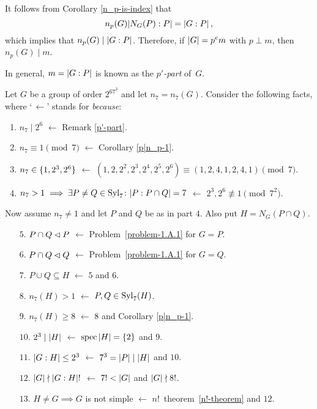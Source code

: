 \begin{rem}\label{p'-part}
    It follows from {\rm Corollary \ref{n_p-is-index}} that
    $$
        n_p(G)|N_G(P):P|=\left\vert{G:P}\right\vert,
    $$
    which implies that $n_p(G)\mid\left\vert{G:P}\right\vert$. Therefore, if\/ $\left\vert{G}\right\vert=p^em$ with $p\perp m$, then $n_p(G)\mid m$.

    In general, $m=\left\vert{G:P}\right\vert$ is known as the \textsl{$p'$-part} of\/~$G$.
\end{rem}


\begin{xmpl}
    Let $G$ be a group of order $2^67^3$ and let $n_7=n_7(G)$. Consider the following facts, where `$\,\leftarrow$' stands for \emph{because}:
    \begin{enumerate}[$1$.]
        \item $n_7\mid2^6$ $\leftarrow$ {\rm Remark \ref{p'-part}}.
        \item $n_7\equiv1\pmod7$ $\leftarrow$ {\rm Corollary \ref{p|n_p-1}}.
        \item $n_7\in\{1, 2^3, 2^6\}$ $\leftarrow$ $(1, 2, 2^2, 2^3, 2^4, 2^5, 2^6)\equiv(1, 2, 4, 1, 2, 4, 1)\pmod7$.
        \item $n_7>1\implies\exists P\ne Q\in{\rm Syl}_7\colon |P:P\cap Q|=7$ $\leftarrow$ $2^3,2^6\not\equiv1\pmod{7^2}$.
    \end{enumerate}
        Now assume\/ $n_7\ne1$ and let\/ $P$ and\/ $Q$ be as in part $4$. Also put $H=N_G(P\cap Q)$.
    \begin{enumerate}
        \item[$5$.] $P\cap Q\lhd P$ $\leftarrow$ {\rm Problem~\ref{problem-1.A.1} for $G=P$}.
        \item[$6$.] $P\cap Q\lhd Q$ $\leftarrow$ {\rm Problem~\ref{problem-1.A.1} for $G=Q$}.
        \item[$7$.] $P\cup Q\subseteq H$ $\leftarrow$ {\rm $5$ and $6$}.
        \item[$8$.] $n_7(H)>1$ $\leftarrow$ $P,Q\in{\rm Syl}_7(H)$.
        \item[$9$.] $n_7(H)\ge8$ $\leftarrow$ {\rm $8$ and Corollary \ref{p|n_p-1}}.
        \item[$10$.] $2^3\mid\left\vert{H}\right\vert$ $\leftarrow$ {\rm $\operatorname{spec}\left\vert{H}\right\vert=\{2\}$ and $9$}. 
        \item[$11$.] $\left\vert{G:H}\right\vert\le2^3$ $\leftarrow$ {\rm $7^3=\left\vert{P}\right\vert\mid\left\vert{H}\right\vert$ and $10$}.
        \item[$12$.] $\left\vert{G}\right\vert\nmid\left\vert{G:H}\right\vert!$ $\leftarrow$ {\rm $7!<\left\vert{G}\right\vert$ and $\left\vert{G}\right\vert\nmid8!$}.
        \item[$13$.] $H\ne G\implies G$ is not simple $\leftarrow$ {\rm $n!$~theorem~\ref{n!-theorem} and $12$}.

\end{enumerate}
\end{xmpl}
